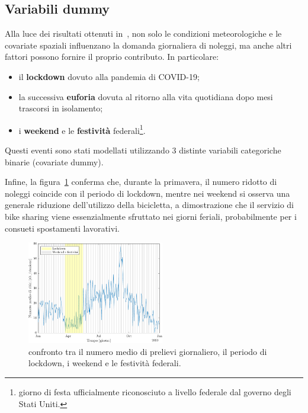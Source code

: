 \subsection[Variabili dummy]{Variabili dummy}
Alla luce dei risultati ottenuti in~\citep{paper_bike_sharing_Otto}, non solo le condizioni meteorologiche e le covariate spaziali influenzano la domanda giornaliera di noleggi, ma anche altri fattori possono fornire il proprio contributo. In particolare:
\begin{itemize}
	\item il \textbf{lockdown} dovuto alla pandemia di COVID-\num{19};
	\item la successiva \textbf{euforia} dovuta al ritorno alla vita quotidiana dopo mesi trascorsi in isolamento;
	\item i \textbf{weekend} e le \textbf{festività} federali\footnote{giorno di festa ufficialmente riconosciuto a livello federale dal governo degli Stati Uniti.}.
\end{itemize}
Questi eventi sono stati modellati utilizzando \num{3} distinte variabili categoriche binarie (covariate dummy).
\par Infine, la figura~\ref{ritiri_vs_dummy} conferma che, durante la primavera, il numero ridotto di noleggi coincide con il periodo di lockdown, mentre nei weekend si osserva una generale riduzione dell'utilizzo della bicicletta, a dimostrazione che il servizio di bike sharing viene essenzialmente sfruttato nei giorni feriali, probabilmente per i consueti spostamenti lavorativi.

\begin{figure}[htpb]
	\centering
	\includegraphics[height=170px]{Immagini/4. Caso di studio/Serie storiche/Ritiri giornalieri e dummy}
	\caption[Confronto tra il numero medio di prelievi giornaliero, il periodo di lockdown, i weekend e le festività federali]{confronto tra il numero medio di prelievi giornaliero, il periodo di lockdown, i weekend e le festività federali.}
	\label{ritiri_vs_dummy}
\end{figure}


